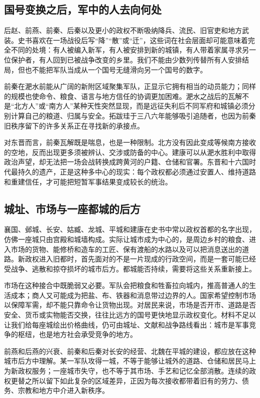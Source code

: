 \subsection{国号变换之后，军中的人去向何处}

后赵、前燕、前秦、后秦以及更小的政权不断吸纳降兵、流民、旧官吏和地方武装。史书喜欢在一场战役后写“降”“散”或“迁”，这些词在社会层面却可能意味着完全不同的处境：有人被编入新军，有人被安排到新的城镇，有人带着家属寻求另一位保护者，有人回到已被战争改变的乡里。我们不能由少数列传替所有人安排结局，但也不能把军队当成从一个国号无缝滑向另一个国号的数字。

前秦在淝水前能从广阔的新附区域聚集军队，正显示它拥有相当的动员能力；同样的规模也使命令、粮食、语言与地方信任的协调更加困难。淝水之战后的瓦解不是“北方人”或“南方人”某种天性突然显现，而是远征失利后不同军府和城镇必须分别计算自己的粮道、归属与安全。拓跋珪于三八六年能够吸引追随者，也因为前秦旧秩序留下的许多关系正在寻找新的承接点。

对东晋而言，前秦瓦解既是喘息，也是一种限制。北方没有因此变成等候南方接收的空地，反而出现更多须被辨认、交涉或防备的中心。建康可以从淝水胜利中取得政治声望，却无法把一场会战转换成跨黄河的户籍、仓储和官署。东晋和十六国时代最持久的遗产，正是这种多中心的现实：每个政权都必须通过安置人、维持道路和重建信任，才可能把短暂军事结果变成较长的统治。

\subsection{城址、市场与一座都城的后方}

襄国、邺城、长安、姑臧、龙城、平城和建康在史书中常以政权首都的名字出现，仿佛一座城只由宫殿和城墙构成。实际让城市成为中心的，是周边乡村的粮食、进入市场的货物、能修桥和造车的工匠、保有渡船的水路以及可以把消息送出的道路。新政权进入旧都时，首先面对的不是一片现成的行政空间，而是一套可能已经受战争、逃散和掠夺损坏的城市后方。都城能否持续，需要将这些关系重新接上。

市场在这种接合中既脆弱又必要。军队会把粮食和牲畜拉向城内，推高普通人的生活成本；商人又可能成为把盐、布、铁器和消息带过边界的人。国家希望控制市场以保障军需，却不能只靠命令让货物出现。对居民来说，市场是否开市、道路是否安全、货币或实物能否交换，往往比远方的国号更快地显示政权变化。材料不足以让我们给每座城绘出价格曲线，仍可由城址、文献和战争路线看出：城市是军事竞争的枢纽，也是地方社会承受竞争的地方。

前燕和后燕的兴衰、前秦和后秦对长安的经营、北魏在平城的建设，都应放在这种城市后方中理解。某一军队攻得一城，不等于能够让城外的道路、仓储和居民马上为新政权服务；一座城市失守，也不等于其市场、手艺和记忆全部消散。连续的政权更替之所以留下如此复杂的区域差异，正因为每次接收都带着旧有的劳力、债务、宗教和地方中介进入新秩序。

